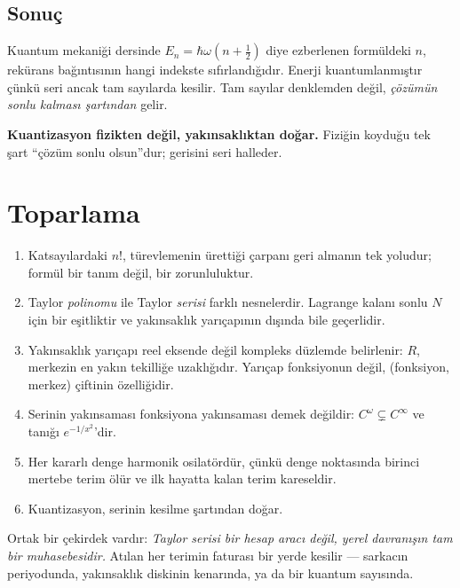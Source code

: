 \documentclass[11pt,a4paper]{article}
\theoremstyle{plain}
\theoremstyle{definition}
\theoremstyle{remark}
\begin{document}
\subsection*{Sonuç}

Kuantum mekaniği dersinde $E_n = \hbar\omega(n+\tfrac12)$ diye ezberlenen
formüldeki $n$, rekürans bağıntısının hangi indekste sıfırlandığıdır.
Enerji kuantumlanmıştır çünkü seri ancak tam sayılarda kesilir. Tam sayılar
denklemden değil, \emph{çözümün sonlu kalması şartından} gelir.

\textbf{Kuantizasyon fizikten değil, yakınsaklıktan doğar.} Fiziğin koyduğu
tek şart ``çözüm sonlu olsun''dur; gerisini seri halleder.

\section{Toparlama}

\begin{enumerate}[leftmargin=*]
\item Katsayılardaki $n!$, türevlemenin ürettiği çarpanı geri almanın tek
      yoludur; formül bir tanım değil, bir zorunluluktur.
\item Taylor \emph{polinomu} ile Taylor \emph{serisi} farklı nesnelerdir.
      Lagrange kalanı sonlu $N$ için bir eşitliktir ve yakınsaklık yarıçapının
      dışında bile geçerlidir.
\item Yakınsaklık yarıçapı reel eksende değil kompleks düzlemde belirlenir:
      $R$, merkezin en yakın tekilliğe uzaklığıdır. Yarıçap fonksiyonun değil,
      (fonksiyon, merkez) çiftinin özelliğidir.
\item Serinin yakınsaması fonksiyona yakınsaması demek değildir:
      $C^\omega \subsetneq C^\infty$ ve tanığı $e^{-1/x^2}$'dir.
\item Her kararlı denge harmonik osilatördür, çünkü denge noktasında birinci
      mertebe terim ölür ve ilk hayatta kalan terim kareseldir.
\item Kuantizasyon, serinin kesilme şartından doğar.
\end{enumerate}

Ortak bir çekirdek vardır: \emph{Taylor serisi bir hesap aracı değil, yerel
davranışın tam bir muhasebesidir.} Atılan her terimin faturası bir yerde
kesilir --- sarkacın periyodunda, yakınsaklık diskinin kenarında, ya da bir
kuantum sayısında.
\end{document}
